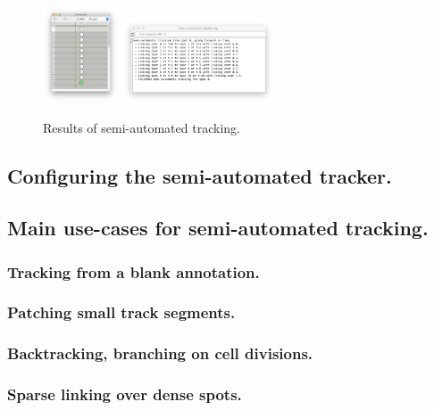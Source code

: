\begin{figure}
    \centering
    \null\hfill
    \includegraphics[width=0.2\textwidth]{figures/Mastodon_SemiAutoTracking_02.png}
    \hfill
    \includegraphics[width=0.4\textwidth]{figures/Mastodon_SemiAutoTracking_03.png}
    \hfill\null
    \caption{Results of semi-automated tracking.}
    \label{fig:AfterSemiAutoTracking}
\end{figure}



\subsection{Configuring the semi-automated tracker.}

\subsection{Main use-cases for semi-automated tracking.}

\subsubsection{Tracking from a blank annotation. }

\subsubsection{Patching small track segments.}

\subsubsection{Backtracking, branching on cell divisions. }

\subsubsection{Sparse linking over dense spots.}
